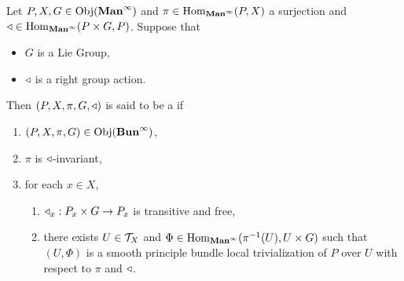 \documentclass{book}
\begin{document}
\begin{defn} \ld{}
	Let $P,X, G \in \operatorname{Obj}(\operatorname*{\text{\textbf{Man}}^{\infty}})$ and $\pi \in \operatorname{Hom}_{\operatorname*{\text{\textbf{Man}}^{\infty}}}(P, X)$ a surjection and $\triangleleft \in \operatorname{Hom}_{\operatorname*{\text{\textbf{Man}}^{\infty}}}(P \times G , P)$. Suppose that 
	\begin{itemize}
		\item $G$ is a Lie Group,
		\item $\triangleleft$ is a right group action.
	\end{itemize}
	Then $(P, X, \pi, G, \triangleleft)$ is said to be a  if 
	\begin{enumerate}
		\item $(P, X, \pi, G) \in \operatorname{Obj}(\operatorname*{\text{\textbf{Bun}}^{\infty}})$, 
		\item $\pi$ is $\triangleleft$-invariant,
		\item for each $x \in X$,
		\begin{enumerate}
			\item  $\triangleleft_x: P_x \times G \rightarrow P_x$ is transitive and free,
			\item  there exists $U \in \mathcal{T}_X$ and $\Phi \in \operatorname{Hom}_{\operatorname*{\text{\textbf{Man}}^{\infty}}}(\pi^{-1}(U), U \times G)$ such that $(U, \Phi)$ is a smooth principle bundle local trivialization of $P$ over $U$ with respect to $\pi$ and $\triangleleft$.
		\end{enumerate}
	\end{enumerate}
\end{defn}




\begin{ex}
	
\end{ex}
\end{document}
